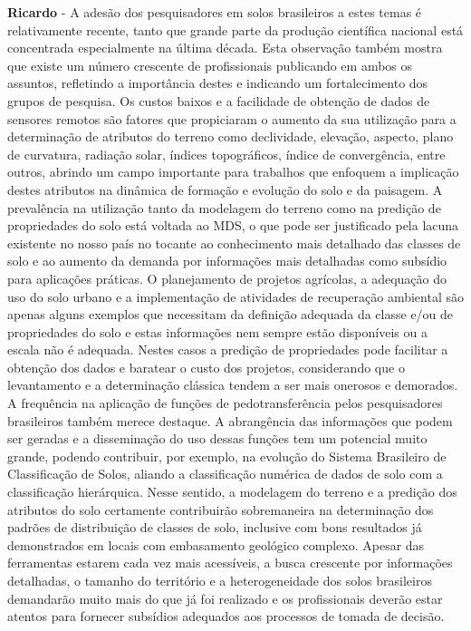 \textbf{Ricardo} - A adesão dos pesquisadores em solos brasileiros a estes temas é relativamente recente, tanto que grande parte da produção científica nacional está concentrada especialmente na última década. Esta observação também mostra que existe um número crescente de profissionais publicando em ambos os assuntos, refletindo a importância destes e indicando um fortalecimento dos grupos de pesquisa. Os custos baixos e a facilidade de obtenção de dados de sensores remotos são fatores que propiciaram o aumento da sua utilização para a determinação de atributos do terreno como declividade, elevação, aspecto, plano de curvatura, radiação solar, índices topográficos, índice de convergência, entre outros, abrindo um campo importante para trabalhos que enfoquem a implicação destes atributos na dinâmica de formação e evolução do solo e da paisagem. A prevalência na utilização tanto da modelagem do terreno como na predição de propriedades do solo está voltada ao MDS, o que pode ser justificado pela lacuna existente no nosso país no tocante ao conhecimento mais detalhado das classes de solo e ao aumento da demanda por informações mais detalhadas como subsídio para aplicações práticas.  O planejamento de projetos agrícolas, a adequação do uso do solo urbano e a implementação de atividades de recuperação ambiental são apenas alguns exemplos que necessitam da definição adequada da classe e/ou de propriedades do solo e estas informações nem sempre estão disponíveis ou a escala não é adequada. Nestes casos a predição de propriedades pode facilitar a obtenção dos dados e baratear o custo dos projetos, considerando que o levantamento e a determinação clássica tendem a ser mais onerosos e demorados. A frequência na aplicação de funções de pedotransferência pelos pesquisadores brasileiros também merece destaque. A abrangência das informações que podem ser geradas e a disseminação do uso dessas funções tem um potencial muito grande, podendo contribuir, por exemplo, na evolução do Sistema Brasileiro de Classificação de Solos, aliando a classificação numérica de dados de solo com a classificação hierárquica. Nesse sentido, a modelagem do terreno e a predição dos atributos do solo certamente contribuirão sobremaneira na determinação dos padrões de distribuição de classes de solo, inclusive com bons resultados já demonstrados em locais com embasamento geológico complexo. Apesar das ferramentas estarem cada vez mais acessíveis, a busca crescente por informações detalhadas, o tamanho do território e a heterogeneidade dos solos brasileiros demandarão muito mais do que já foi realizado e os profissionais deverão estar atentos para fornecer subsídios adequados aos processos de tomada de decisão.\\
